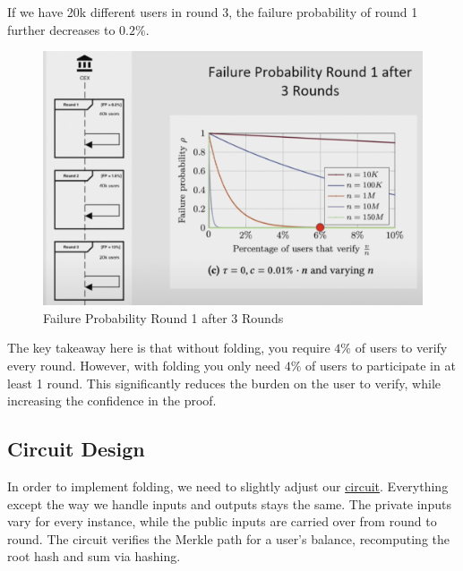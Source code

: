 If we have 20k different users in round 3, the failure probability of round 1 further decreases to $0.2\%$.

\begin{figure}[H]
   \centering
   \includegraphics[width=130mm]{FailureProbabilityRound3.png}
   \caption{Failure Probability Round 1 after 3 Rounds \cite{NS23}}
   \label{overflow}
   \end{figure}
The key takeaway here is that without folding, you require $4\%$ of users to verify every round. However, with folding you only need
$4\%$ of users to participate in at least 1 round. This significantly reduces the burden on the user to verify, while increasing the confidence in the proof.

\subsection{Circuit Design}
In order to implement folding, we need to slightly adjust our \hyperref[subsec:pi]{circuit}. Everything except the way we handle inputs and outputs stays the same.
The private inputs vary for every instance, while the public inputs are carried over from round to round. 
The circuit verifies the Merkle path for a user's balance, recomputing the root hash and sum via hashing.

